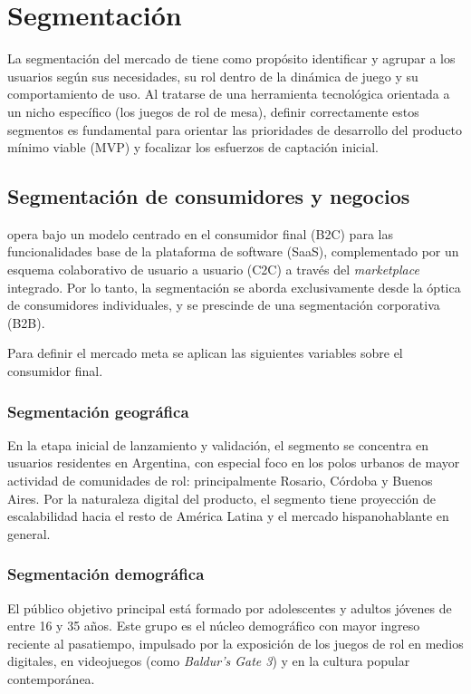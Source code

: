 \capredactadotrue
\section{Segmentación}

La segmentación del mercado de \nombreproyecto{} tiene como propósito identificar y agrupar a los usuarios según sus necesidades, su rol dentro de la dinámica de juego y su comportamiento de uso. Al tratarse de una herramienta tecnológica orientada a un nicho específico (los juegos de rol de mesa), definir correctamente estos segmentos es fundamental para orientar las prioridades de desarrollo del producto mínimo viable (MVP) y focalizar los esfuerzos de captación inicial.

\subsection{Segmentación de consumidores y negocios}
\nombreproyecto{} opera bajo un modelo centrado en el consumidor final (B2C) para las funcionalidades base de la plataforma de software (SaaS), complementado por un esquema colaborativo de usuario a usuario (C2C) a través del \textit{marketplace} integrado. Por lo tanto, la segmentación se aborda exclusivamente desde la óptica de consumidores individuales, y se prescinde de una segmentación corporativa (B2B).

Para definir el mercado meta se aplican las siguientes variables sobre el consumidor final.

\subsubsection{Segmentación geográfica}
En la etapa inicial de lanzamiento y validación, el segmento se concentra en usuarios residentes en Argentina, con especial foco en los polos urbanos de mayor actividad de comunidades de rol: principalmente Rosario, Córdoba y Buenos Aires. Por la naturaleza digital del producto, el segmento tiene proyección de escalabilidad hacia el resto de América Latina y el mercado hispanohablante en general.

\subsubsection{Segmentación demográfica}
El público objetivo principal está formado por adolescentes y adultos jóvenes de entre 16 y 35 años. Este grupo es el núcleo demográfico con mayor ingreso reciente al pasatiempo, impulsado por la exposición de los juegos de rol en medios digitales, en videojuegos (como \textit{Baldur's Gate 3}) y en la cultura popular contemporánea.

